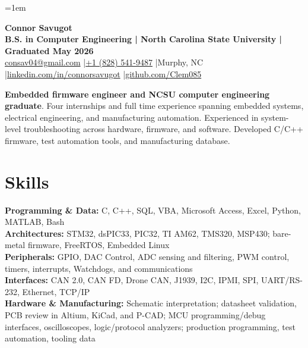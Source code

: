 \documentclass[10pt,letterpaper]{article}
\begin{document}
\fontsize{9.85}{10.85}\selectfont
\setlength{\RaggedRightRightskip}{0pt plus 5em}
\RaggedRight
\emergencystretch=1em

\begin{center}
  {\color{resumeBlue}\fontsize{24.5}{25.2}\selectfont\bfseries Connor Savugot}\\[2.5pt]
  {\bfseries B.S. in Computer Engineering | North Carolina State University | Graduated May 2026}\\[1.5pt]
  {\fontsize{9.6}{10.2}\selectfont
    \href{mailto:consav04@gmail.com}{consav04@gmail.com}
    \enspace|\enspace \href{tel:+18285419487}{+1 (828) 541-9487}
    \enspace|\enspace Murphy, NC
    \enspace|\enspace \href{https://linkedin.com/in/connorsavugot}{linkedin.com/in/connorsavugot}
    \enspace|\enspace \href{https://github.com/Clem085}{github.com/Clem085}}
\end{center}
\vspace{-0.18cm}

\textbf{Embedded firmware engineer and NCSU computer engineering graduate}. Four internships and full time experience spanning embedded systems, electrical engineering, and manufacturing automation. Experienced in system-level troubleshooting across hardware, firmware, and software. Developed C/C++ firmware, test automation tools, and manufacturing database.

\section{Skills}
\textbf{Programming \& Data:} C, C++, SQL, VBA, Microsoft Access, Excel, Python, MATLAB, Bash\\
\textbf{Architectures:} STM32, dsPIC33, PIC32, TI AM62, TMS320, MSP430; bare-metal firmware, FreeRTOS, Embedded Linux\\
\textbf{Peripherals:} GPIO, DAC Control, ADC sensing and filtering, PWM control, timers, interrupts, Watchdogs, and communications\\
\textbf{Interfaces:} CAN 2.0, CAN FD, Drone CAN, J1939, I2C, IPMI, SPI, UART/RS-232, Ethernet, TCP/IP\\
\textbf{Hardware \& Manufacturing:} Schematic interpretation; datasheet validation, PCB review in Altium, KiCad, and P-CAD; MCU programming/debug interfaces, oscilloscopes, logic/protocol analyzers; production programming, test automation, tooling data
\end{document}
